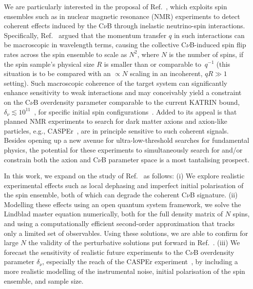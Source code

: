 \documentclass[aps,prd,10pt,twocolumn,superscriptaddress,floatfix,nofootinbib,amsmath,amssymb,altaffilletter,preprintnumbers]{revtex4-1}
\begin{document}
We are particularly interested in the proposal of Ref.~\cite{Arvanitaki:2024taq}, which exploits spin ensembles such as in  
nuclear magnetic resonance (NMR) experiments to detect coherent effects induced by the C$\nu$B through inelastic neutrino-spin interactions.  Specifically, Ref.~\cite{Arvanitaki:2024taq} argued that the momentum transfer $q$ in such interactions can be macroscopic in wavelength terms,
causing the collective C$\nu$B-induced spin flip rates across the spin ensemble to scale as $N^2$, where $N$ is the number of spins, if the spin sample's physical size $R$ is smaller than or comparable to~$q^{-1}$  (this situation is to be compared with an $\propto N$ scaling in an incoherent, $qR \gg 1$ setting).  Such macroscopic coherence of the target system can significantly enhance sensitivity to weak interactions and may conceivably yield a constraint on the C$\nu$B overdensity parameter comparable to the current KATRIN bound, $\delta_\nu \lesssim 10^{11}$~\cite{KATRIN:2022kkv}, for specific initial spin configurations~\cite{Arvanitaki:2024taq}.  
Added to its appeal is that planned NMR experiments to search for dark matter axions and axion-like particles, e.g., CASPEr~\cite{Budker:2013hfa, JacksonKimball:2017elr}, are in principle sensitive to such coherent signals. 
Besides opening up a new avenue for ultra-low-threshold searches for fundamental physics, the potential for these experiments to simultaneously search for and/or constrain both the axion and C$\nu$B parameter space is a most tantalising prospect.


In this work, we expand on the study of Ref.~\cite{Arvanitaki:2024taq} as follows: (i) We explore realistic experimental effects such as local dephasing and imperfect initial polarisation of the spin ensemble, both of which can degrade the coherent C$\nu$B signature. (ii) Modelling these effects using an open quantum system framework, we solve the Lindblad master equation numerically, both for the full density matrix of $N$ spins, and using a computationally efficient second-order approximation that tracks only a limited set of observables. Using these solutions, we are able to confirm for large $N$ the validity of the perturbative solutions put forward in Ref.~\cite{Arvanitaki:2024taq}.  (iii) We forecast the sensitivity of realistic future experiments to the C$\nu$B overdensity parameter $\delta_\nu$, especially the reach of the CASPEr experiment~\cite{Budker:2013hfa, JacksonKimball:2017elr,Walter:2025ldb}, by including a more realistic modelling of the instrumental noise, initial polarisation of the spin ensemble, and sample size. 
\end{document}
